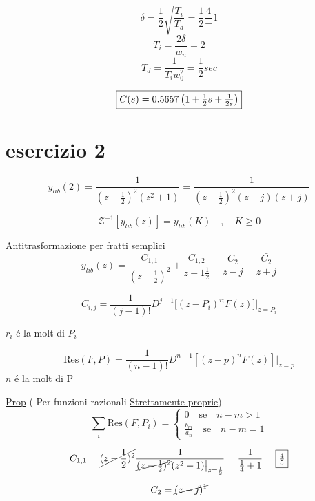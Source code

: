 \documentclass{article}
\begin{document}
\[ \delta = \frac{1}{2}\sqrt{\frac{T_i}{T_d}} = \frac{1}{2}\frac{4} = 1 \]
\[ T_i = \frac{2\delta}{w_n} = 2 \]
\[ T_d = \frac{1}{T_i w_0^2} = \frac{1}{2} sec \]

\[\framebox{$C(s) = 0.5657 \left( 1 + \frac{1}{2}s + \frac{1}{2s}\right) $}\]

\section{esercizio 2}
\[ y_{lib}(2) = \frac{1}{(z - \frac{1}{2}) ^2 (z^2 + 1)}  = \frac{1}{\left(z - \frac{1}{2}\right)^2(z -j)(z + j)} \]

\[ \mathcal{Z}^{-1}[ y_{lib}(z)] = y_{lib}(K) \quad , \quad K \ge 0 \]

Antitrasformazione per fratti semplici
\[ y_{lib}(z) = \frac{C_{1, 1}}{\left( z - \frac{1}{2}\right)^2} + \frac{C_{1, 2}}{z - 1\frac{1}{2}} + \frac{C_2}{z - j} - \frac{\bar{C_2}}{z+j} \]

\[ C_{i, j} = \frac{1}{(j-1)!} D^{j-1}\big[ (z-P_i)^{r_i} F(z)\big]\big|_{z=P_i} \]

$r_i$ \'e la molt di $P_i$

\[ \text{Res}(F, P) = \frac{1}{(n-1)!} D^{n-1}[(z-p)^n F(z)]\big|_{z=p} \]
$n$ \'e la molt di P

\underline{Prop} ( Per funzioni razionali \underline{Strettamente proprie})
\[
    \sum_i \text{Res}(F, P_i) = \begin{cases}
        0 \quad \text{se} \quad n-m > 1 \\
        \frac{b_m}{a_n} \quad \text{se} \quad n-m = 1
    \end{cases}
\]

\[ C_{1,1} = \cancel{(z - \frac{1}{2})^2} \frac{1}{\cancel{(z - \frac{1}{2})^2} (z^2 +1) \big|_{z=\frac{1}{2}}} = \frac{1}{\frac{1}{4} + 1} = \framebox{$\frac{4}{5}$} \]

\[ C_2 = \cancel{(z - j)^1} \]
\end{document}
